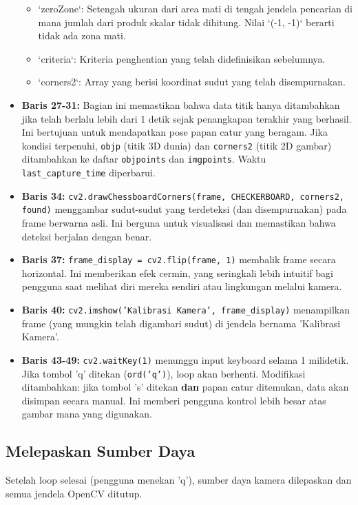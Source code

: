 \documentclass[12pt,a4paper]{article}
\begin{document}
\begin{itemize}
\begin{itemize}
              \item `zeroZone`: Setengah ukuran dari area mati di tengah jendela pencarian di mana jumlah dari produk skalar tidak dihitung. Nilai `(-1, -1)` berarti tidak ada zona mati.
              \item `criteria`: Kriteria penghentian yang telah didefinisikan sebelumnya.
              \item `corners2`: Array yang berisi koordinat sudut yang telah disempurnakan.
          \end{itemize}
    \item \textbf{Baris 27-31:} Bagian ini memastikan bahwa data titik hanya ditambahkan jika telah berlalu lebih dari 1 detik sejak penangkapan terakhir yang berhasil. Ini bertujuan untuk mendapatkan pose papan catur yang beragam. Jika kondisi terpenuhi, \texttt{objp} (titik 3D dunia) dan \texttt{corners2} (titik 2D gambar) ditambahkan ke daftar \texttt{objpoints} dan \texttt{imgpoints}. Waktu \texttt{last\_capture\_time} diperbarui.
    \item \textbf{Baris 34:} \texttt{cv2.drawChessboardCorners(frame, CHECKERBOARD, corners2, found)} menggambar sudut-sudut yang terdeteksi (dan disempurnakan) pada frame berwarna asli. Ini berguna untuk visualisasi dan memastikan bahwa deteksi berjalan dengan benar.
    \item \textbf{Baris 37:} \texttt{frame\_display = cv2.flip(frame, 1)} membalik frame secara horizontal. Ini memberikan efek cermin, yang seringkali lebih intuitif bagi pengguna saat melihat diri mereka sendiri atau lingkungan melalui kamera.
    \item \textbf{Baris 40:} \texttt{cv2.imshow('Kalibrasi Kamera', frame\_display)} menampilkan frame (yang mungkin telah digambari sudut) di jendela bernama 'Kalibrasi Kamera'.
    \item \textbf{Baris 43-49:} \texttt{cv2.waitKey(1)} menunggu input keyboard selama 1 milidetik. Jika tombol 'q' ditekan (\texttt{ord('q')}), loop akan berhenti. Modifikasi ditambahkan: jika tombol 's' ditekan \textbf{dan} papan catur ditemukan, data akan disimpan secara manual. Ini memberi pengguna kontrol lebih besar atas gambar mana yang digunakan.
\end{itemize}

\subsection{Melepaskan Sumber Daya}
Setelah loop selesai (pengguna menekan 'q'), sumber daya kamera dilepaskan dan
semua jendela OpenCV ditutup.
\end{document}
